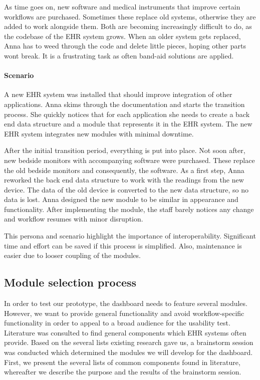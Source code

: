         As time goes on, new software and medical instruments that improve certain workflows are purchased. Sometimes these replace old systems, otherwise they are added to work alongside them. Both are becoming increasingly difficult to do, as the codebase of the EHR system grows. When an older system gets replaced, Anna has to weed through the code and delete little pieces, hoping other parts wont break. It is a frustrating task as often band-aid solutions are applied.

        \paragraph{Scenario} A new EHR system was installed that should improve integration of other applications. Anna skims through the documentation and starts the transition process. She quickly notices that for each application she needs to create a back end data structure and a module that represents it in the EHR system. The new EHR system integrates new modules with minimal downtime.

        After the initial transition period, everything is put into place. Not soon after, new bedside monitors with accompanying software were purchased. These replace the old bedside monitors and consequently, the software. As a first step, Anna reworked the back end data structure to work with the readings from the new device. The data of the old device is converted to the new data structure, so no data is lost. Anna designed the new module to be similar in appearance and functionality. After implementing the module, the staff barely notices any change and workflow resumes with minor disruption.\bigskip

        \noindent This persona and scenario highlight the importance of interoperability. Significant time and effort can be saved if this process is simplified. Also, maintenance is easier due to looser coupling of the modules.

    \subsection{Module selection process}\label{module_brainstorm}

    In order to test our prototype, the dashboard needs to feature several modules. However, we want to provide general functionality and avoid workflow-specific functionality in order to appeal to a broad audience for the usability test. Literature was consulted to find general components which EHR systems often provide. Based on the several lists existing research gave us, a brainstorm session was conducted which determined the modules we will develop for the dashboard. First, we present the several lists of common components found in literature, whereafter we describe the purpose and the results of the brainstorm session.

